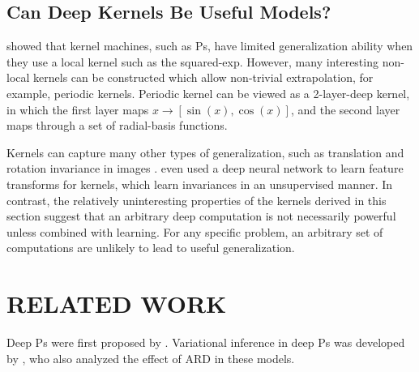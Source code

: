 \documentclass[twoside]{article}
\makeatletter
\newlength{\nonHumbleHeight}
\def\@humbleformat#1{{\settoheight{\nonHumbleHeight}{#1}\resizebox{!}{0.94\nonHumbleHeight}{#1}}}%
\def\humble#1{\@humbleformat{#1}}%
\newcommand{\gp}{{\humble GP}}
\newcommand{\sectiondist}{}
\makeatother
\begin{document}
\subsection{Can Deep Kernels Be Useful Models?}
\sectiondist

\cite{NIPS2005_424} showed that kernel machines, such as \gp{}s, have limited generalization ability when they use a local kernel such as the squared-exp.  However, many interesting non-local kernels can be constructed which allow non-trivial extrapolation, for example, periodic kernels. Periodic kernel can be viewed as a 2-layer-deep kernel, in which the first layer maps $x \rightarrow [\sin(x), \cos(x)]$, and the second layer maps through a set of radial-basis functions.  

Kernels can capture many other types of generalization, such as translation and rotation invariance in images \citep{kondor2008group}.  \cite{SalHin08} even used a deep neural network to learn feature transforms for kernels, which learn invariances in an unsupervised manner.  
%
In contrast, the relatively uninteresting properties of the kernels derived in this section suggest that an arbitrary deep computation is not necessarily powerful unless combined with learning.  For any specific problem, an arbitrary set of computations are unlikely to lead to useful generalization. %



\section{RELATED WORK}
\sectiondist

Deep \gp{}s were first proposed by \cite{lawrence2007hierarchical}. Variational inference in deep \gp{}s was developed by \cite{damianou2012deep}, who also analyzed the effect of ARD in these models.
%
%
\end{document}
